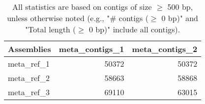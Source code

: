 \documentclass[12pt,a4paper]{article}
\begin{document}
\begin{table}[ht]
\begin{center}
\caption{All statistics are based on contigs of size $\geq$ 500 bp, unless otherwise noted (e.g., "\# contigs ($\geq$ 0 bp)" and "Total length ($\geq$ 0 bp)" include all contigs).}
\begin{tabular}{|l*{2}{|r}|}
\hline
Assemblies & meta\_contigs\_1 & meta\_contigs\_2 \\ \hline
meta\_ref\_1 & 50372 & 50372 \\ \hline
meta\_ref\_2 & 58663 & 58868 \\ \hline
meta\_ref\_3 & 69110 & 63015 \\ \hline
\end{tabular}
\end{center}
\end{table}
\end{document}
